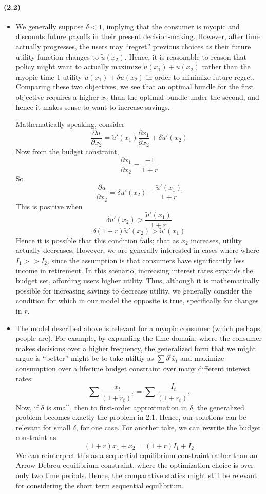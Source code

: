 \documentclass[10pt,letter]{article}
\begin{document}
\paragraph{(2.2)}
\begin{itemize}
\item We generally suppose $\delta < 1$, implying that the consumer is myopic and discounts future payoffs in their present decision-making. However, after time actually progresses, the users may ``regret'' previous choices as their future utility function changes to $\tilde{u}(x_2)$. Hence, it is reasonable to reason that policy might want to actually maximize $\tilde{u}(x_1) + \tilde{u}(x_2)$ rather than the myopic time 1 utility $\tilde{u}(x_1) + \delta \tilde{u}(x_2)$ in order to minimize future regret. Comparing these two objectives, we see that an optimal bundle for the first objective requires a higher $x_2$ than the optimal bundle under the second, and hence it makes sense to want to increase savings.

Mathematically speaking, consider
\[ \frac{\partial u}{\partial x_2} = \tilde{u}'(x_1) \frac{\partial x_1}{\partial x_2} + \delta \tilde{u}'(x_2) \]
Now from the budget constraint,
\[ \frac{\partial x_1}{\partial x_2} = \frac{-1}{1+r} \]
So
\[ \frac{\partial u}{\partial x_2} = \delta \tilde{u}'(x_2) -  \frac{\tilde{u}'(x_1)}{1+r}  \]
This is positive when
\[ \delta \tilde{u}'(x_2)  >  \frac{\tilde{u}'(x_1)}{1+r} \]
\[ \delta(1+r) \tilde{u}'(x_2) > \tilde{u}'(x_1) \]
Hence it is possible that this condition fails; that as $x_2$ increases, utility actually decreases. However, we are generally interested in cases where where $I_1 >> I_2$, since the assumption is that consumers have significantly less income in retirement. In this scenario, increasing interest rates expands the budget set, affording users higher utility. Thus, although it is mathematically possible for increasing savings to decrease utility, we generally consider the condition for which in our model the opposite is true, specifically for changes in $r$.
\item The model described above is relevant for a myopic consumer (which perhaps people are). For example, by expanding the time domain, where the consumer makes decisions over a higher frequency, the generalized form that we might argue is ``better'' might be to take utiltiy as $\sum \delta^t \tilde{x_t}$ and maximize consumption over a lifetime budget constraint over many different interest rates:
\[ \sum \frac{x_t}{(1+r_t)^t} =  \sum \frac{I_t}{(1+r_t)^t} \]
Now, if $\delta$ is small, then to first-order approximation in $\delta$, the generalized problem becomes exactly the problem in 2.1. Hence, our solutions can be relevant for small $\delta$, for one case. For another take, we can rewrite the budget constraint as
\[ (1+r)x_1 + x_2 = (1+r)I_1 + I_2 \]
We can reinterpret this as a sequential equilibrium constraint rather than an Arrow-Debreu equilibrium constraint, where the optimization choice is over only two time periods. Hence, the comparative statics might still be relevant for considering the short term sequential equilibrium.
\end{itemize}
\end{document}

